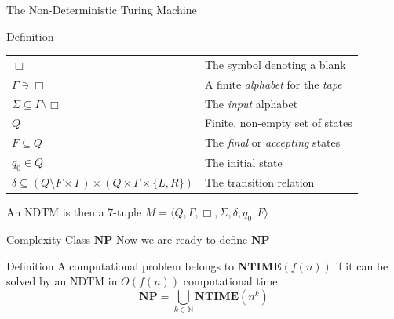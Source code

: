 \documentclass{beamer}
\newcommand{\Natural}{\mathbb{N}}
\newcommand{\NPTIME}{\mathbf{NP}}
\newcommand{\NTIME}{\mathbf{NTIME}}
\begin{document}
  \begin{frame}{The Non-Deterministic Turing Machine}
      \pause
      \begin{block}{Definition}
          \pause
          \begin{table}[]
              \centering
              \begin{tabular}{ll}
                  $\Box$ & The symbol denoting a blank \pause \\
                  $\Gamma \ni \Box$
                  & A finite \textit{alphabet} for the \textit{tape} \pause \\
                  $\Sigma \subseteq \Gamma \setminus \Box$ 
                  & The \textit{input} alphabet \pause \\
                  $Q$ & Finite, non-empty set of states \pause \\
                  $F \subseteq Q$
                  & The \textit{final} or \textit{accepting} states \pause \\
                  $q_0 \in Q$ & The initial state \pause \\
                  $\delta \subseteq (Q \setminus F \times \Gamma ) \times (Q
                  \times \Gamma \times \{L, R\})$ & The transition relation
              \end{tabular}
          \end{table}
          \pause
          An NDTM is then a 7-tuple
          $M = \langle Q, \Gamma, \Box, \Sigma, \delta, q_0, F \rangle$
      \end{block}
  \end{frame}
  \begin{frame}{Complexity Class $\NPTIME$}
      Now we are ready to define $\NPTIME$
      \pause
      \begin{block}{Definition}
          A computational problem belongs to
              $\NTIME\left(f(n)\right)$ if it can be solved by an
              NDTM in $O(f(n))$ computational time 
              \pause
          $$\NPTIME = \bigcup_{k \in \Natural}
              \NTIME\left(n^k\right)$$
      \end{block}
  \end{frame}
\end{document}

